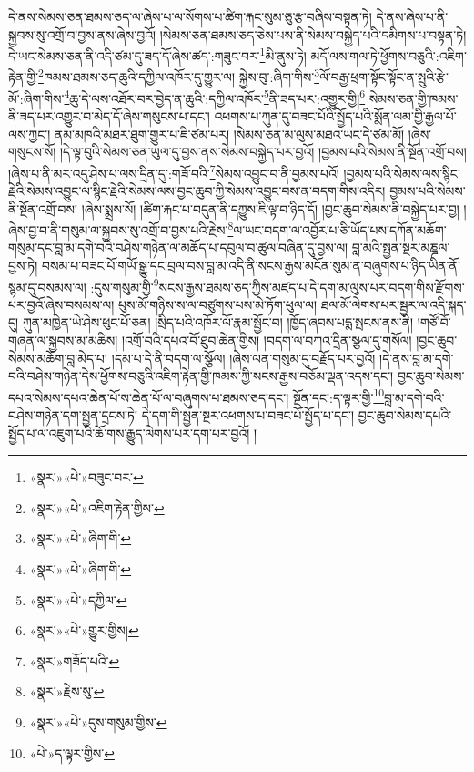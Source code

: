 དེ་ནས་སེམས་ཅན་ཐམས་ཅད་ལ་ཞེས་པ་ལ་སོགས་པ་ཚིག་རྐང་སུམ་ཅུ་རྩ་བཞིས་བསྟན་ཏེ། དེ་ནས་ཞེས་པ་ནི་སྐྱབས་སུ་འགྲོ་བ་བྱས་ནས་ཞེས་བྱའོ། །སེམས་ཅན་ཐམས་ཅད་ཅེས་པས་ནི་སེམས་བསྐྱེད་པའི་དམིགས་པ་བསྟན་ཏེ། དེ་ཡང་སེམས་ཅན་ནི་འདི་ཙམ་དུ་ཟད་དོ་ཞེས་ཚད་:གཟུང་བར་\footnote{«སྣར་»«པེ་»བཟུང་བར་}མི་ནུས་ཏེ། མདོ་ལས་གལ་ཏེ་ཕྱོགས་བཅུའི་:འཇིག་རྟེན་གྱི་\footnote{«སྣར་»«པེ་»འཇིག་རྟེན་གྱིས་}ཁམས་ཐམས་ཅད་ཆུའི་དཀྱིལ་འཁོར་དུ་གྱུར་ལ། སྐྱེས་བུ་:ཞིག་གིས་\footnote{«སྣར་»«པེ་»ཞིག་གི་}ལོ་བརྒྱ་ཕྲག་སྟོང་སྟོང་ན་སྤུའི་རྩེ་མོ་:ཞིག་གིས་\footnote{«སྣར་»«པེ་»ཞིག་གི་}ཆུ་དེ་ལས་འཐོར་བར་བྱེད་ན་ཆུའི་:དཀྱིལ་འཁོར་\footnote{«སྣར་»«པེ་»དཀྱིལ་}ནི་ཟད་པར་:འགྱུར་གྱི།\footnote{«སྣར་»«པེ་»གྱུར་གྱིས།} སེམས་ཅན་གྱི་ཁམས་ནི་ཟད་པར་འགྱུར་བ་མེད་དོ་ཞེས་གསུངས་པ་དང་། འཕགས་པ་ཀུན་དུ་བཟང་པོའི་སྤྱོད་པའི་སྨོན་ལམ་གྱི་རྒྱལ་པོ་ལས་ཀྱང་། ནམ་མཁའི་མཐར་ཐུག་གྱུར་པ་ཇི་ཙམ་པར། །སེམས་ཅན་མ་ལུས་མཐའ་ཡང་དེ་ཙམ་མོ། །ཞེས་གསུངས་སོ། །དེ་ལྟ་བུའི་སེམས་ཅན་ཡུལ་དུ་བྱས་ནས་སེམས་བསྐྱེད་པར་བྱའོ། །བྱམས་པའི་སེམས་ནི་སྔོན་འགྲོ་བས། །ཞེས་པ་ནི་མར་འདུ་ཤེས་པ་ལས་དྲིན་དུ་:གཟོ་བའི་\footnote{«སྣར་»གཟོད་པའི་}སེམས་འབྱུང་བ་ནི་བྱམས་པའོ། །བྱམས་པའི་སེམས་ལས་སྙིང་རྗེའི་སེམས་འབྱུང་ལ་སྙིང་རྗེའི་སེམས་ལས་བྱང་ཆུབ་ཀྱི་སེམས་འབྱུང་བས་ན་བདག་གིས་འདིར། བྱམས་པའི་སེམས་ནི་སྔོན་འགྲོ་བས། །ཞེས་སྨྲས་སོ། །ཚིག་རྐང་པ་བདུན་ནི་དཀྱུས་ཇི་ལྟ་བ་ཉིད་དོ། །བྱང་ཆུབ་སེམས་ནི་བསྐྱེད་པར་བྱ། །ཞེས་བྱ་བ་ནི་གསུམ་ལ་སྐྱབས་སུ་འགྲོ་བ་བྱས་པའི་རྗེས་\footnote{«སྣར་»རྗེས་སུ་}ལ་ཡང་བདག་ལ་འབྱོར་པ་ཅི་ཡོད་པས་དཀོན་མཆོག་གསུམ་དང་བླ་མ་དགེ་བའི་བཤེས་གཉེན་ལ་མཆོད་པ་དབུལ་བ་ཚུལ་བཞིན་དུ་བྱས་ལ། བླ་མའི་སྤྱན་སྔར་མཎྜལ་བྱས་ཏེ། བསམ་པ་བཟང་པོ་གཡོ་སྒྱུ་དང་བྲལ་བས་བླ་མ་འདི་ནི་སངས་རྒྱས་མངོན་སུམ་ན་བཞུགས་པ་ཉིད་ཡིན་ནོ་སྙམ་དུ་བསམས་ལ། :དུས་གསུམ་གྱི་\footnote{«སྣར་»«པེ་»དུས་གསུམ་གྱིས་}སངས་རྒྱས་ཐམས་ཅད་ཀྱིས་མཛད་པ་དེ་དག་མ་ལུས་པར་བདག་གིས་རྫོགས་པར་བྱའོ་ཞེས་བསམས་ལ། པུས་མོ་གཉིས་ས་ལ་བཙུགས་པས་མེ་ཏོག་ཕུལ་ལ། ཐལ་མོ་ལེགས་པར་སྦྱར་ལ་འདི་སྐད་དུ། ཀུན་མཁྱེན་ཡེ་ཤེས་ཕུང་པོ་ཅན། །སྲིད་པའི་འཁོར་ལོ་རྣམ་སྦྱོང་བ། །ཁྱོད་ཞབས་པདྨ་སྤངས་ནས་ནི། །གཙོ་བོ་གཞན་ལ་སྐྱབས་མ་མཆིས། །འགྲོ་བའི་དཔའ་བོ་ཐུབ་ཆེན་གྱིས། །བདག་ལ་བཀའ་དྲིན་སྩལ་དུ་གསོལ། །བྱང་ཆུབ་སེམས་མཆོག་བླ་མེད་པ། །དམ་པ་དེ་ནི་བདག་ལ་སྩོལ། །ཞེས་ལན་གསུམ་དུ་བརྗོད་པར་བྱའོ། །དེ་ནས་བླ་མ་དགེ་བའི་བཤེས་གཉེན་དེས་ཕྱོགས་བཅུའི་འཇིག་རྟེན་གྱི་ཁམས་ཀྱི་སངས་རྒྱས་བཅོམ་ལྡན་འདས་དང་། བྱང་ཆུབ་སེམས་དཔའ་སེམས་དཔའ་ཆེན་པོ་ས་ཆེན་པོ་ལ་བཞུགས་པ་ཐམས་ཅད་དང་། སྔོན་དང་:ད་ལྟར་གྱི་\footnote{«པེ་»ད་ལྟར་གྱིས་}བླ་མ་དགེ་བའི་བཤེས་གཉེན་དག་སྤྱན་དྲངས་ཏེ། དེ་དག་གི་སྤྱན་སྔར་འཕགས་པ་བཟང་པོ་སྤྱོད་པ་དང་། བྱང་ཆུབ་སེམས་དཔའི་སྤྱོད་པ་ལ་འཇུག་པའི་ཆོ་གས་རྒྱུད་ལེགས་པར་དག་པར་བྱའོ། །

